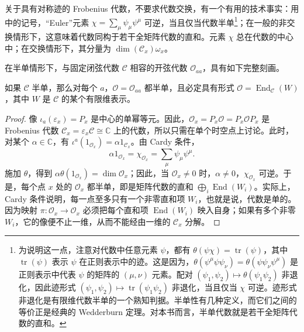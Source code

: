 关于具有对称迹的 Frobenius 代数，不要求代数交换，有一个有用的技术事实：用中的记号，“Euler”元素 $\chi=\sum_\mu\psi_\mu\psi^\mu$ 可逆，当且仅当代数半单\footnote{为说明这一点，注意对代数中任意元素 $\psi$，都有 $\theta(\psi\chi)=\operatorname{tr}(\psi)$，其中 $\operatorname{tr}(\psi)$ 表示 $\psi$ 在正则表示中的迹。这是因为，$\theta(\psi^\mu\psi\psi_\nu)=\theta(\psi\psi_\nu\psi^\mu)$ 是正则表示中代表 $\psi$ 的矩阵的 $(\mu,\nu)$ 元素。配对 $(\psi_1,\psi_2)\mapsto\theta(\psi_1\psi_2)$ 非退化，因此迹形式 $(\psi_1,\psi_2)\mapsto\operatorname{tr}(\psi_1\psi_2)$ 非退化，当且仅当 $\chi$ 可逆。迹形式非退化是有限维代数半单的一个熟知判据。半单性有几种定义，而它们之间的等价正是经典的 Wedderburn 定理。对本书而言，半单代数就是若干全矩阵代数的直和。}；在一般的非交换情形下，这意味着代数同构于若干全矩阵代数的直和。元素 $\chi$ 总在代数的中心中；在交换情形下，其分量为 $\dim(\mathcal{C}_x)\omega_x$。

在半单情形下，与固定闭弦代数 $\mathcal{C}$ 相容的开弦代数 $\mathcal{O}_{aa}$，具有如下完整刻画。

\begin{theorem}\label{thm:2.6}
如果 $\mathcal{C}$ 半单，那么对每个 $a$，$\mathcal{O}=\mathcal{O}_{aa}$ 都半单，且必定具有形式 $\mathcal{O}=\operatorname{End}_{\mathcal{C}}(W)$，其中 $W$ 是 $\mathcal{C}$ 的某个有限维表示。
\end{theorem}

\begin{proof}
像 $\iota_a(\varepsilon_x)=P_x$ 是中心的单幂等元。因此，$\mathcal{O}_x=P_x\mathcal{O}=P_x\mathcal{O}P_x$ 是 Frobenius 代数 $\mathcal{C}_x=\varepsilon_x\mathcal{C}\cong\mathbb{C}$ 上的代数，所以只需在单个时空点上讨论。此时，对某个 $\alpha\in\mathbb{C}$，有 $\iota^a(1_{\mathcal{O}_x})=\alpha1_{\mathcal{C}_x}$。由 Cardy 条件，
\begin{equation}\label{eq:2.32}
\alpha1_{\mathcal{O}_x}=\chi_{\mathcal{O}_x}=\sum_\mu\psi_\mu\psi^\mu.
\end{equation}
施加 $\theta$，得到 $\alpha\theta(1_{\mathcal{O}_x})=\dim\mathcal{O}_x$；因此，当 $\mathcal{O}_x\neq0$ 时，$\alpha\neq0$，$\chi_{\mathcal{O}_x}$ 可逆。于是，每个点 $x$ 处的 $\mathcal{O}_x$ 都半单，即是矩阵代数的直和 $\bigoplus_i\operatorname{End}(W_i)$。实际上，Cardy 条件说明，每一点至多只有一个非零直和项 $W_i$，也就是说，代数是单的。因为映射 $\pi\colon\mathcal{O}_x\to\mathcal{O}_x$ 必须把每个直和项 $\operatorname{End}(W_i)$ 映入自身；如果有多个非零 $W_i$，它的像便不止一维，从而不能经由一维的 $\mathcal{C}_x$ 分解。\BookQED
\end{proof}

